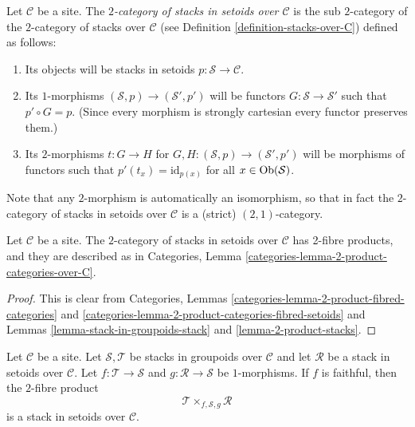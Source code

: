 \begin{definition}
\label{definition-stacks-in-setoids-over-C}
Let $\mathcal{C}$ be a site.
The {\it $2$-category of stacks in setoids over $\mathcal{C}$}
is the sub $2$-category of the $2$-category of stacks
over $\mathcal{C}$ (see Definition \ref{definition-stacks-over-C})
defined as follows:
\begin{enumerate}
\item Its objects will be stacks in setoids
$p : \mathcal{S} \to \mathcal{C}$.
\item Its $1$-morphisms $(\mathcal{S}, p) \to (\mathcal{S}', p')$
will be functors $G : \mathcal{S} \to \mathcal{S}'$ such that
$p' \circ G = p$. (Since every morphism is strongly cartesian
every functor preserves them.)
\item Its $2$-morphisms $t : G \to H$ for
$G, H : (\mathcal{S}, p) \to (\mathcal{S}', p')$
will be morphisms of functors
such that $p'(t_x) = \text{id}_{p(x)}$
for all $x \in \mathop{\mathrm{Ob}}\nolimits(\mathcal{S})$.
\end{enumerate}
\end{definition}

\noindent
Note that any $2$-morphism is automatically an isomorphism, so
that in fact the $2$-category of stacks in setoids over $\mathcal{C}$
is a (strict) $(2, 1)$-category.

\begin{lemma}
\label{lemma-2-product-stacks-in-setoids}
Let $\mathcal{C}$ be a site.
The $2$-category of stacks in setoids over $\mathcal{C}$
has 2-fibre products, and they are described as in
Categories, Lemma \ref{categories-lemma-2-product-categories-over-C}.
\end{lemma}

\begin{proof}
This is clear from
Categories, Lemmas \ref{categories-lemma-2-product-fibred-categories} and
\ref{categories-lemma-2-product-categories-fibred-setoids}
and
Lemmas \ref{lemma-stack-in-groupoids-stack} and
\ref{lemma-2-product-stacks}.
\end{proof}

\begin{lemma}
\label{lemma-2-fibre-product-gives-stack-in-setoids}
Let $\mathcal{C}$ be a site.
Let $\mathcal{S}, \mathcal{T}$ be stacks in groupoids over $\mathcal{C}$
and let $\mathcal{R}$ be a stack in setoids over $\mathcal{C}$.
Let $f : \mathcal{T} \to \mathcal{S}$ and $g : \mathcal{R} \to \mathcal{S}$
be $1$-morphisms. If $f$ is faithful, then the $2$-fibre product
$$
\mathcal{T} \times_{f, \mathcal{S}, g} \mathcal{R}
$$
is a stack in setoids over $\mathcal{C}$.
\end{lemma}


